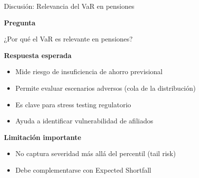 \documentclass[10pt]{beamer}
\begin{document}

\begin{frame}{Discusión: Relevancia del VaR en pensiones}

\textbf{Pregunta}

\vspace{0.3cm}
¿Por qué el VaR es relevante en pensiones?

\vspace{0.4cm}

\textbf{Respuesta esperada}

\begin{itemize}
\item Mide riesgo de insuficiencia de ahorro previsional
\item Permite evaluar escenarios adversos (cola de la distribución)
\item Es clave para stress testing regulatorio
\item Ayuda a identificar vulnerabilidad de afiliados
\end{itemize}

\vspace{0.4cm}

\textbf{Limitación importante}

\begin{itemize}
\item No captura severidad más allá del percentil (tail risk)
\item Debe complementarse con Expected Shortfall
\end{itemize}

\end{frame}

\end{document}
